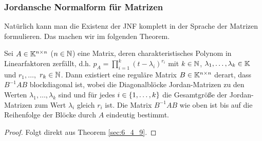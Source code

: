 \subsubsection{Jordansche Normalform für Matrizen}

Natürlich kann man die Existenz der JNF komplett in der Sprache der Matrizen formulieren. Das machen wir im folgenden Theorem. 

\begin{thm}
	Sei $ A \in \mathbb K^{n \times n} $ ($ n \in \mathbb N $) eine Matrix, deren charakteristisches Polynom in Linearfaktoren zerfällt, d.h. $ p_A = \prod_{i=1}^{k} (t-\lambda_i)^{r_i} $ mit $ k \in \mathbb N $, $ \lambda_1, \ldots, \lambda_k \in \mathbb K $ und $ r_1, \ldots, $ $ r_k \in \mathbb N $. Dann existiert eine reguläre Matrix $ B \in \mathbb K^{n \times n} $ derart, dass $ B^{-1}AB $ blockdiagonal ist, wobei die Diagonalblöcke Jordan-Matrizen zu den Werten $ \lambda_1, \ldots, \lambda_k $ sind und für jedes $ i \in \{ 1,\ldots,k \} $ die Gesamtgröße der Jordan-Matrizen zum Wert $ \lambda_i $ gleich $ r_i $ ist. Die Matrix $ B^{-1}AB $ wie oben ist bis auf die Reihenfolge der Blöcke durch $ A $ eindeutig bestimmt.
\end{thm}
\begin{proof}
	Folgt direkt aus Theorem \ref{sec:6_4_9}.
\end{proof}
